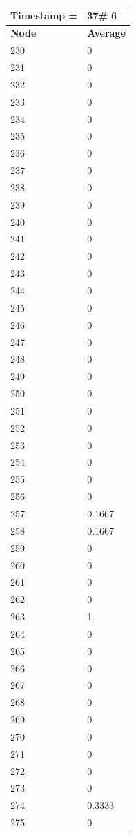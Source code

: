 \begin{tabular}{|l||l|}
\hline
\textbf{Timestamp =} & \textbf{37}\# 6\\\hline
	\textbf{Node} & \textbf{Average} \\ \hline
\hline
	230 & 0 \\ \hline
	231 & 0 \\ \hline
	232 & 0 \\ \hline
	233 & 0 \\ \hline
	234 & 0 \\ \hline
	235 & 0 \\ \hline
	236 & 0 \\ \hline
	237 & 0 \\ \hline
	238 & 0 \\ \hline
	239 & 0 \\ \hline
	240 & 0 \\ \hline
	241 & 0 \\ \hline
	242 & 0 \\ \hline
	243 & 0 \\ \hline
	244 & 0 \\ \hline
	245 & 0 \\ \hline
	246 & 0 \\ \hline
	247 & 0 \\ \hline
	248 & 0 \\ \hline
	249 & 0 \\ \hline
	250 & 0 \\ \hline
	251 & 0 \\ \hline
	252 & 0 \\ \hline
	253 & 0 \\ \hline
	254 & 0 \\ \hline
	255 & 0 \\ \hline
	256 & 0 \\ \hline
	257 & 0.1667 \\ \hline
	258 & 0.1667 \\ \hline
	259 & 0 \\ \hline
	260 & 0 \\ \hline
	261 & 0 \\ \hline
	262 & 0 \\ \hline
	263 & 1 \\ \hline
	264 & 0 \\ \hline
	265 & 0 \\ \hline
	266 & 0 \\ \hline
	267 & 0 \\ \hline
	268 & 0 \\ \hline
	269 & 0 \\ \hline
	270 & 0 \\ \hline
	271 & 0 \\ \hline
	272 & 0 \\ \hline
	273 & 0 \\ \hline
	274 & 0.3333 \\ \hline
	275 & 0 \\ \hline
\end{tabular}

